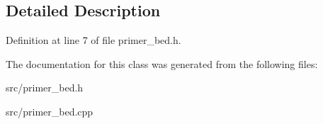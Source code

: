 \subsection{Detailed Description}


Definition at line 7 of file primer\+\_\+bed.\+h.



The documentation for this class was generated from the following files\+:\begin{DoxyCompactItemize}
\item 
src/primer\+\_\+bed.\+h\item 
src/primer\+\_\+bed.\+cpp\end{DoxyCompactItemize}
